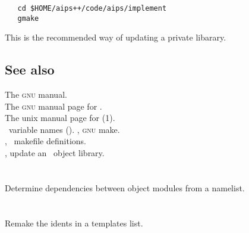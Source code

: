 \begin{verbatim}
   cd $HOME/aips++/code/aips/implement
   gmake
\end{verbatim}

\noindent
This is the recommended way of updating a private libarary.

\subsection*{See also}

The \textsc{gnu}  manual.\\
The \textsc{gnu} manual page for .\\
The unix manual page for (1).\\
\aipspp\ variable names ().
, \textsc{gnu} make.\\
, \aipspp\ makefile definitions.\\
, update an \aipspp\ object library.

 
\newpage
\section{}
\label{ldmap}
 
Determine dependencies between object modules from a namelist.

 
\newpage
\section{}
\label{reident}
 
Remake the idents in a templates list.

